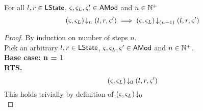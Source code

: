 \begin{lemma}[]\label{lem:amodClosureImplication}
For all $l, r \in \textsf{LState}$, $\varsigma_{}, \varsigma_{L}, \varsigma_{}' \in \textsf{AMod}$ and $n \in \mathbb{N}^{+}$
%
\[
	\left(\varsigma_{}, \varsigma_{L}\right) \!\downarrow_{n} \left(l, r, \varsigma_{}'\right) \implies \left(\varsigma_{}, \varsigma_{L}\right) \!\downarrow_{(n-1)} \left(l, r, \varsigma_{}'\right)
\]
%
\begin{proof} By induction on number of steps $n$.\\
Pick an arbitrary $l, r \in \textsf{LState}$, $\varsigma_{}, \varsigma_{L}, \varsigma_{}' \in \textsf{AMod}$ and $n \in \mathbb{N}^{+}$.\\
\textbf{Base case: n = 1}\\
\textbf{RTS.} 
%
\begin{equation}
	\left(\varsigma_{}, \varsigma_{L}\right) \!\downarrow_{0} \left(l, r, \varsigma_{}'\right) \nonumber
\end{equation}
%
This holds trivially by definition of $\left(\varsigma_{}, \varsigma_{L}\right)\!\downarrow_{0}$\\


\end{proof}
\end{lemma}
